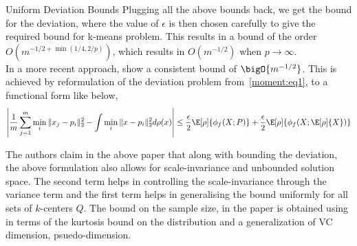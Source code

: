\documentclass[10pt]{article}
\begin{document}
\begin{psection}{Uniform Deviation Bounds}
    Plugging all the above bounds back, we get the bound for the deviation, where the
    value of $\epsilon$ is then chosen carefully to give the required bound for k-means
    problem. This results in a bound of the order $O(m^{-1/2 + \min(1/4, 2/p)})$, which
    results in $O(m^{-1/2})$ when $p \rightarrow \infty$. \\ In a more recent approach,
    \citet{approx-kmeanspp} show a consistent bound of $\bigO{m^{-1/2}}$. This is
    achieved by reformulation of the deviation problem from~\ref{moment:eq1}, to a
    functional form like below, 
    \begin{equation}
        \label{moment:eq7}
        \left\vert \frac{1}{m} \sum_{j=1}^m \min_i \Vert x_j - p_i \Vert^2_2 -\int \min_i \Vert x - p_i \Vert^2_2 d\rho(x)   \right\vert  \leq \frac{\epsilon}{2}\E[\rho]{\phi_f(X; P)} +  \frac{\epsilon}{2} \E[\rho]{\phi_f(X; \E[\rho]{X})}
    \end{equation}

    The authors claim in the above paper that along with bounding the deviation, the
    above formulation also allows for scale-invariance and unbounded solution space. The
    second term helps in controlling the scale-invariance through the variance term and
    the first term helps in generalising the bound uniformly for all sets of $k$-centers
    $Q$. The bound on the sample size, in the paper is obtained using in terms of the
    kurtosis bound on the distribution and a  generalization of VC dimension,
    psuedo-dimension. 
\end{psection}
\end{document}
